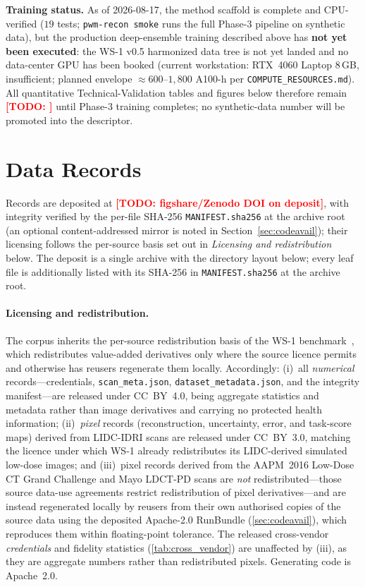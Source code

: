 \documentclass{article}
\newcommand{\todo}[1]{\textcolor{red}{\textbf{[TODO: #1]}}}
\newcommand{\datadoi}{\todo{figshare/Zenodo DOI on deposit}}
\begin{document}
\textbf{Training status.} As of 2026-08-17, the method scaffold is complete and
CPU-verified ($19$ tests; \texttt{pwm-recon smoke} runs the full Phase-3 pipeline on
synthetic data), but the production deep-ensemble training described above has
\textbf{not yet been executed}: the WS-1 v0.5 harmonized data tree is not yet landed
and no data-center GPU has been booked (current workstation: RTX~4060 Laptop 8\,GB,
insufficient; planned envelope $\approx 600$--$1{,}800$ A100-h per
\texttt{COMPUTE\_RESOURCES.md}). All quantitative Technical-Validation tables and
figures below therefore remain \todo{} until Phase-3 training completes; no
synthetic-data number will be promoted into the descriptor.

\section{Data Records}
\label{sec:datarecords}
\label{sec:data_records}

Records are deposited at \datadoi{}, with integrity verified by the
per-file SHA-256 \texttt{MANIFEST.sha256} at the archive root (an optional
content-addressed mirror is noted in Section~\ref{sec:codeavail}); their
licensing follows the per-source basis set out in \emph{Licensing and
redistribution} below. The deposit is a single archive with the directory
layout below; every leaf file is additionally listed with its SHA-256 in
\texttt{MANIFEST.sha256} at the archive root.

\paragraph{Licensing and redistribution.} The corpus inherits the
per-source redistribution basis of the WS-1 benchmark~\citep{ws1dataset},
which redistributes value-added derivatives only where the source licence
permits and otherwise has reusers regenerate them locally. Accordingly:
(i)~all \emph{numerical} records---credentials, \texttt{scan\_meta.json},
\texttt{dataset\_metadata.json}, and the integrity manifest---are released
under CC~BY~4.0, being aggregate statistics and metadata rather than image
derivatives and carrying no protected health information; (ii)~\emph{pixel}
records (reconstruction, uncertainty, error, and task-score maps) derived
from LIDC-IDRI scans are released under CC~BY~3.0, matching the licence
under which WS-1 already redistributes its LIDC-derived simulated low-dose
images; and (iii)~pixel records derived from the AAPM~2016 Low-Dose CT
Grand Challenge and Mayo LDCT-PD scans are \emph{not} redistributed---those
source data-use agreements restrict redistribution of pixel
derivatives---and are instead regenerated locally by reusers from their own
authorised copies of the source data using the deposited Apache-2.0
RunBundle (\autoref{sec:codeavail}), which reproduces them within
floating-point tolerance. The released cross-vendor \emph{credentials} and
fidelity statistics (\autoref{tab:cross_vendor}) are unaffected by (iii),
as they are aggregate numbers rather than redistributed pixels. Generating
code is Apache~2.0.
\end{document}
